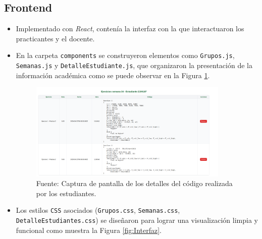 \documentclass[letter,oneside,12pt,spanish]{report}
\begin{document}
\subsection{Frontend}
\begin{itemize}
    \item Implementado con \textit{React}, contenía la interfaz con la que interactuaron los practicantes y el docente.
    \item En la carpeta \texttt{components} se construyeron elementos como \texttt{Grupos.js}, \texttt{Semanas.js} y \texttt{DetalleEstudiante.js}, que organizaron la presentación de la información académica como se puede observar en la Figura \ref{fig:Detalles}.
    
	\begin{figure}[ht]
		\centering
		\includegraphics[width=0.9\textwidth]{Figs/Detalles_practica.pdf}
		\label{fig:Detalles}
		\\Fuente: Captura de pantalla de los detalles del código realizada por los estudiantes.
	\end{figure}

	\item Los estilos \texttt{CSS} asociados (\texttt{Grupos.css}, \texttt{Semanas.css}, \texttt{DetalleEstudiantes.css}) se diseñaron para lograr una visualización limpia y funcional como muestra la Figura \ref{fig:Interfaz}.
    

\end{itemize}
\end{document}
